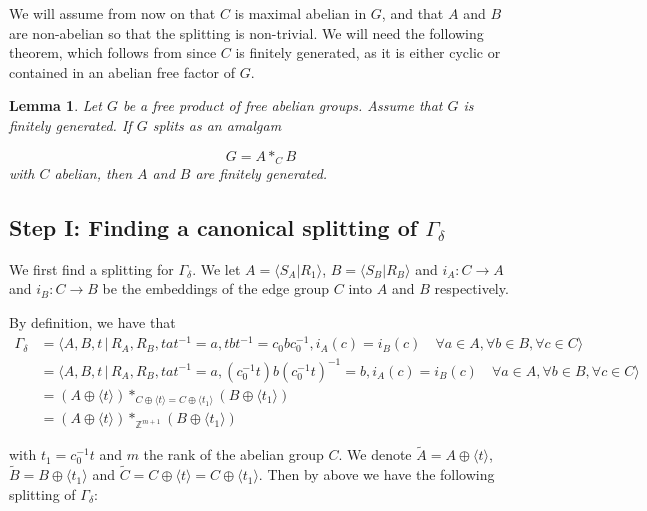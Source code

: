 \documentclass{amsart}
\theoremstyle{plain}
\newtheorem{lemma}[thm]{Lemma}
\theoremstyle{definition}
\theoremstyle{remark}
\begin{document}
We will assume from now on that $C$ is maximal abelian in $G$, and that $A$ and $B$ are non-abelian so that the splitting is non-trivial. We will need the following theorem, which follows from \cite[Theorem 1.3]{Finiteness_properties_graphs_of_groups} since $C$ is finitely generated, as it is either cyclic or contained in an abelian free factor of $G$. 

\begin{lemma}
    \label{lemma: A and B are finitely generated in separating case}
    Let $G$ be a free product of free abelian groups. Assume that $G$ is finitely generated. If $G$ splits as an amalgam 

    $$G = A *_C B$$ with $C$ abelian, then $A$ and $B$ are finitely generated.
\end{lemma}

\subsection{Step I: Finding a canonical splitting of $\Gamma_{\delta}$}
\label{subsection: Step 1}


We first find a splitting for $\Gamma_\delta$. We let $A=\langle S_A \vert R_1 \rangle$, $B=\langle S_B \vert R_B \rangle$ and $i_A:C \to A$ and $i_B: C\to B$ be the embeddings of the edge group $C$ into $A$ and $B$ respectively.


By definition, we have that 
\begin{align*}
        \Gamma_\delta &= \langle A,B,t \, \vert \, R_A, R_B, tat^{-1}=a, tbt^{-1}=c_0bc_0^{-1}, i_A(c)=i_B(c) \quad \forall a\in A, \forall b \in B, \forall c\in C \rangle \\
        &= \langle A,B,t \, \vert \, R_{A}, R_{B}, tat^{-1}=a, (c_{0}^{-1}t)b(c_{0}^{-1}t)^{-1}=b, i_{A}(c)=i_{B}(c) \quad \forall a \in A, \forall b\in B, \forall c\in C \rangle \\
        &=(A \oplus \langle t\rangle) *_{C \oplus \langle t \rangle =C \oplus \langle t_1 \rangle} (B \oplus \langle t_1 \rangle) \\
        &=(A \oplus \langle t\rangle) *_{\mathbb Z^{m+1}} (B \oplus \langle t_1 \rangle)
\end{align*}

with $t_1=c_0^{-1}t$ and $m$ the rank of the abelian group $C$. We denote $\tilde{A} = A \oplus \langle t \rangle$, $\tilde{B} = B \oplus \langle t_1 \rangle$ and $\tilde{C} = C \oplus \langle t \rangle = C \oplus \langle t_1 \rangle$. Then by above we have the following splitting of $\Gamma_{\delta}$:
\end{document}
